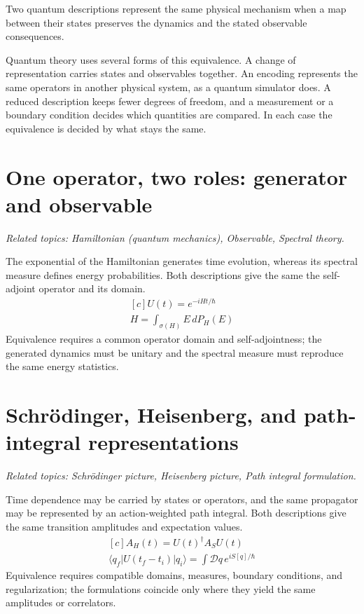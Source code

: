 \documentclass[11pt,oneside]{book}
\newenvironment{centeredalign}{\[\begin{gathered}[c]}{\end{gathered}\]}
\begin{document}
\begin{claimbox}
Two quantum descriptions represent the same physical mechanism when a map between their states preserves the dynamics and the stated observable consequences.
\end{claimbox}
Quantum theory uses several forms of this equivalence. A change of representation carries states and observables together. An encoding represents the same operators in another physical system, as a quantum simulator does. A reduced description keeps fewer degrees of freedom, and a measurement or a boundary condition decides which quantities are compared. In each case the equivalence is decided by what stays the same.
\section{One operator, two roles: generator and observable}
\par\noindent\textit{Related topics: Hamiltonian (quantum mechanics), Observable, Spectral theory.}\par
The exponential of the Hamiltonian generates time evolution, whereas its spectral measure defines energy probabilities. Both descriptions give the same the self-adjoint operator and its domain.
\begin{centeredalign}
U(t)=e^{-iHt/\hbar}\\
H=\int_{\sigma(H)}E\,dP_H(E)
\end{centeredalign}
Equivalence requires a common operator domain and self-adjointness; the generated dynamics must be unitary and the spectral measure must reproduce the same energy statistics.
\section{Schrödinger, Heisenberg, and path-integral representations}
\par\noindent\textit{Related topics: Schrödinger picture, Heisenberg picture, Path integral formulation.}\par
Time dependence may be carried by states or operators, and the same propagator may be represented by an action-weighted path integral. Both descriptions give the same transition amplitudes and expectation values.
\begin{centeredalign}
A_H(t)=U(t)^\dagger A_SU(t)\\
\langle q_f|U(t_f-t_i)|q_i\rangle=\int\mathcal Dq\,e^{iS[q]/\hbar}
\end{centeredalign}
Equivalence requires compatible domains, measures, boundary conditions, and regularization; the formulations coincide only where they yield the same amplitudes or correlators.
\end{document}

